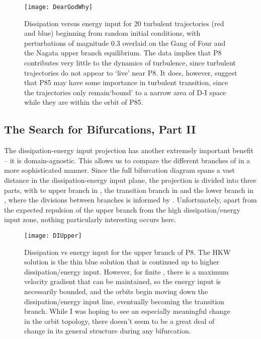 \begin{figure}[h]
\texttt{[image: DearGodWhy]}
\caption{Dissipation versus energy input for 20 turbulent trajectories (red and blue) beginning from random initial conditions, with perturbations of magnitude $0.3$ overlaid on the Gang of Four and the Nagata upper branch equilibrium. The data implies that P8 contributes very little to the dynamics of turbulence, since turbulent trajectories do not appear to `live' near P8. It does, however, suggest that P85 may have some importance in turbulent transition, since the trajectories only remain`bound' to a narrow area of D-I space while they are within the orbit of P85.}\label{fig:turbDI}
\end{figure}

\subsection{The Search for Bifurcations, Part II}
The dissipation-energy input projection has another extremely important benefit -- it is domain-agnostic. This allows us to compare the different branches of  in a more sophisticated manner. Since the full bifurcation diagram spans a vast distance in the dissipation-energy input plane, the projection is divided into three parts, with te upper branch in , the transition branch in  and the lower branch in , where the divisions between branches is informed by . Unfortunately, apart from the expected repulsion of the upper branch from the high dissipation/energy input zone, nothing particularly interesting occurs here.\\


\begin{figure}[h]
\texttt{[image: DIUpper]}
\caption{Dissipation vs energy input for the upper branch of P8. The HKW solution is the thin blue solution that is continued up to higher dissipation/energy input. However, for finite \ReN, there is a maximum velocity gradient that can be maintained, so the energy input is necessarily bounded, and the orbits begin moving down the dissipation/energy input line, eventually becoming the transition branch. While I was hoping to see an especially meaningful change in the orbit topology, there doesn't seem to be a great deal of change in its general structure during any bifurcation. }\label{fig:DIUpper}
\end{figure}

